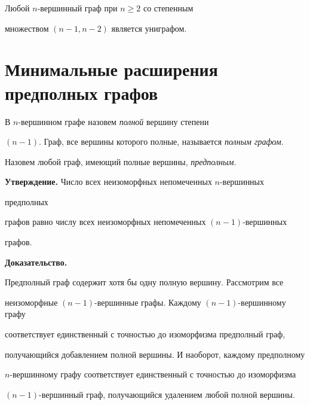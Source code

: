 \begin{cor}


Любой $n$-вершинный граф при $n\geq 2 $ со степенным


множеством $(n-1,n-2)$ является униграфом.


\end{cor}








\section{Минимальные расширения предполных графов}





\begin{defn}


В $n$-вершинном графе назовем {\it полной} вершину степени


$(n-1)$. Граф, все вершины которого полные, называется {\it полным графом}.


Назовем любой граф, имеющий полные вершины, {\it предполным}.


\end{defn}





{\bf Утверждение.} Число всех неизоморфных непомеченных $n$-вершинных 


предполных


графов равно числу всех неизоморфных непомеченных $(n-1)$-вершинных


графов.


\medskip





{\bf Доказательство.}


Предполный граф содержит хотя бы одну полную вершину. Рассмотрим все


неизоморфные $(n-1)$-вершинные графы. Каждому $(n-1)$-вершинному графу


соответствует единственный с точностью до изоморфизма предполный граф,


получающийся добавлением полной вершины. И наоборот, каждому предполному


$n$-вершинному графу соответствует единственный с точностью до изоморфизма


$(n-1)$-вершинный граф, получающийся удалением любой полной вершины.


